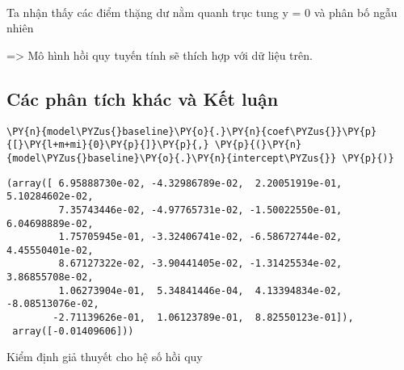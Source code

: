     \begin{center}
    \end{center}
    { \hspace*{\fill} \\}
    
    Ta nhận thấy các điểm thặng dư nằm quanh trục tung y = 0 và phân bố ngẫu
nhiên

=\textgreater{} Mô hình hồi quy tuyến tính sẽ thích hợp với dữ liệu
trên.

    \hypertarget{cuxe1c-phuxe2n-tuxedch-khuxe1c-vuxe0-kux1ebft-luux1eadn}{%
\subsection{Các phân tích khác và Kết
luận}\label{cuxe1c-phuxe2n-tuxedch-khuxe1c-vuxe0-kux1ebft-luux1eadn}}

    \begin{tcolorbox}[breakable, size=fbox, boxrule=1pt, pad at break*=1mm,colback=cellbackground, colframe=cellborder]
\begin{Verbatim}[commandchars=\\\{\}]
\PY{n}{model\PYZus{}baseline}\PY{o}{.}\PY{n}{coef\PYZus{}}\PY{p}{[}\PY{l+m+mi}{0}\PY{p}{]}\PY{p}{,} \PY{p}{(}\PY{n}{model\PYZus{}baseline}\PY{o}{.}\PY{n}{intercept\PYZus{}} \PY{p}{)}
\end{Verbatim}
\end{tcolorbox}

            \begin{tcolorbox}[breakable, size=fbox, boxrule=.5pt, pad at break*=1mm, opacityfill=0]
\begin{Verbatim}[commandchars=\\\{\}]
(array([ 6.95888730e-02, -4.32986789e-02,  2.20051919e-01,  5.10284602e-02,
         7.35743446e-02, -4.97765731e-02, -1.50022550e-01,  6.04698889e-02,
         1.75705945e-01, -3.32406741e-02, -6.58672744e-02,  4.45550401e-02,
         8.67127322e-02, -3.90441405e-02, -1.31425534e-02,  3.86855708e-02,
         1.06273904e-01,  5.34841446e-04,  4.13394834e-02, -8.08513076e-02,
        -2.71139626e-01,  1.06123789e-01,  8.82550123e-01]),
 array([-0.01409606]))
\end{Verbatim}
\end{tcolorbox}
        
    Kiểm định giả thuyết cho hệ số hồi quy

